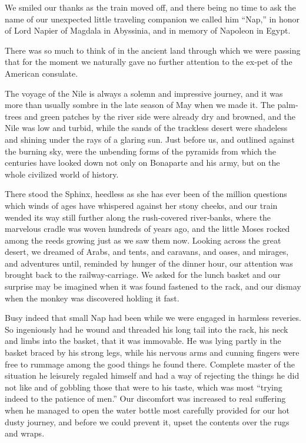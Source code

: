 \documentclass[12pt]{book}
\begin{document}
We smiled our thanks as the train moved off, and there being no time to ask
the name of our unexpected little traveling companion we called him “Nap,” in
honor of Lord Napier of Magdala in Abyssinia, and in memory of Napoleon in
Egypt.

There was so much to think of in the ancient land through which we were
passing that for the moment we naturally gave no further attention to the ex‐pet
of the American consulate.

The voyage of the Nile is always a solemn and impressive journey, and it
was more than usually sombre in the late season of May when we made it. The
palm‐trees and green patches by the river side were already dry and browned,
and the Nile was low and turbid, while the sands of the trackless desert were
shadeless and shining under the rays of a glaring sun. Just before us, and outlined
against the burning sky, were the unbending forms of the pyramids from which
the centuries have looked down not only on Bonaparte and his army, but on the
whole civilized world of history.

There stood the Sphinx, heedless as she has ever been of the million questions which winds of ages have whispered against her stony cheeks, and our
train wended its way still further along the rush‐covered river‐banks, where the
marvelous cradle was woven hundreds of years ago, and the little Moses rocked
among the reeds growing just as we saw them now. Looking across the great
desert, we dreamed of Arabs, and tents, and caravans, and oases, and mirages,
and adventures until, reminded by hunger of the dinner hour, our attention was
brought back to the railway‐carriage. We asked for the lunch basket and our
surprise may be imagined when it was found fastened to the rack, and our dismay
when the monkey was discovered holding it fast.

Busy indeed that small Nap had been while we were engaged in harmless
reveries. So ingeniously had he wound and threaded his long tail into the rack,
his neck and limbs into the basket, that it was immovable. He was lying partly in
the basket braced by his strong legs, while his nervous arms and cunning fingers
were free to rummage among the good things he found there. Complete master of
the situation he leisurely regaled himself and had a way of rejecting the things he
did not like and of gobbling those that were to his taste, which was most “trying
indeed to the patience of men.” Our discomfort was increased to real suffering
when he managed to open the water bottle most carefully provided for our hot
dusty journey, and before we could prevent it, upset the contents over the rugs
and wraps.
\end{document}
